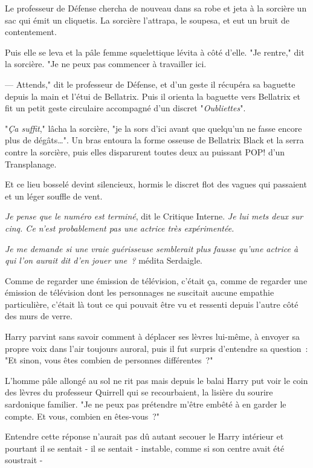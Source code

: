 Le professeur de Défense chercha de nouveau dans sa robe et jeta à la sorcière un sac qui émit un cliquetis. La sorcière l'attrapa, le soupesa, et eut un bruit de contentement.

Puis elle se leva et la pâle femme squelettique lévita à côté d'elle. "Je rentre," dit la sorcière. "Je ne peux pas commencer à travailler ici.

--- Attends," dit le professeur de Défense, et d'un geste il récupéra sa baguette depuis la main et l'étui de Bellatrix. Puis il orienta la baguette vers Bellatrix et fit un petit geste circulaire accompagné d'un discret "\emph{Oubliettes}".

"\emph{Ça suffit}," lâcha la sorcière, "je la sors d'ici avant que quelqu'un ne fasse encore plus de dégâts…". Un bras entoura la forme osseuse de Bellatrix Black et la serra contre la sorcière, puis elles disparurent toutes deux au puissant POP! d'un Transplanage.

Et ce lieu bosselé devint silencieux, hormis le discret flot des vagues qui passaient et un léger souffle de vent.

\emph{Je pense que le numéro est terminé}, dit le Critique Interne. \emph{Je lui mets deux sur cinq. Ce n'est probablement pas une actrice très expérimentée.}

\emph{Je me demande si une vraie guérisseuse semblerait plus fausse qu'une actrice à qui l'on aurait dit d'en jouer une~?} médita Serdaigle.

Comme de regarder une émission de télévision, c'était ça, comme de regarder une émission de télévision dont les personnages ne suscitait aucune empathie particulière, c'était là tout ce qui pouvait être vu et ressenti depuis l'autre côté des murs de verre.

Harry parvint sans savoir comment à déplacer ses lèvres lui-même, à envoyer sa propre voix dans l'air toujours auroral, puis il fut surpris d'entendre sa question~: "Et sinon, vous êtes combien de personnes différentes~?"

L'homme pâle allongé au sol ne rit pas mais depuis le balai Harry put voir le coin des lèvres du professeur Quirrell qui se recourbaient, la lisière du sourire sardonique familier. "Je ne peux pas prétendre m'être embêté à en garder le compte. Et vous, combien en êtes-vous~?"

Entendre cette réponse n'aurait pas dû autant secouer le Harry intérieur et pourtant il se sentait - il se sentait - instable, comme si son centre avait été soustrait -

